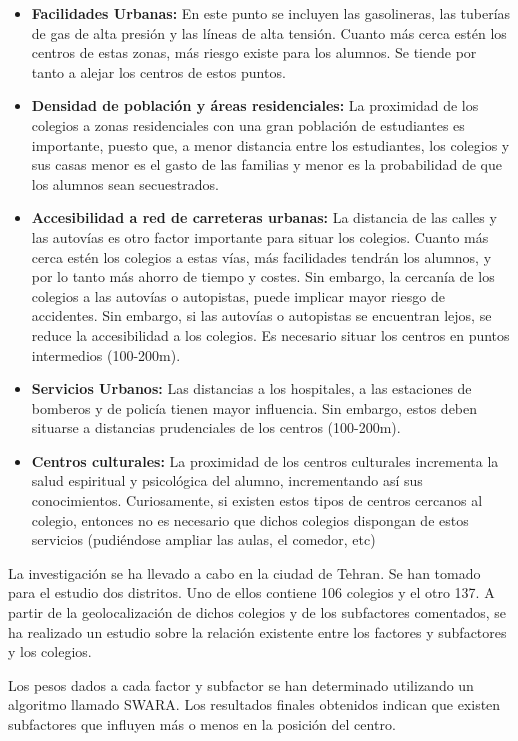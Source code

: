 \begin{itemize}
	\item \textbf{Facilidades Urbanas:} En este punto se incluyen las gasolineras, las tuberías de gas de alta presión y las líneas de alta tensión. Cuanto más cerca estén los centros de estas zonas, más riesgo existe para los alumnos. Se tiende por tanto a alejar los centros de estos puntos.
	\item \textbf{Densidad de población y áreas residenciales:} La proximidad de los colegios a zonas residenciales con una gran población de estudiantes es importante, puesto que, a menor distancia entre los estudiantes, los colegios y sus casas menor es el gasto de las familias y menor es la probabilidad de que los alumnos sean secuestrados.
	\item\textbf{ Accesibilidad a red de carreteras urbanas:} La distancia de las calles y las autovías es otro factor importante para situar los colegios. Cuanto más cerca estén los colegios a estas vías, más facilidades tendrán los alumnos, y por lo tanto más ahorro de tiempo y costes.
	Sin embargo, la cercanía de los colegios a las autovías o autopistas, puede implicar mayor riesgo de accidentes. Sin embargo, si las autovías o autopistas se encuentran lejos, se reduce la accesibilidad a los colegios. Es necesario situar los centros en puntos intermedios (100-200m).
	\item \textbf{Servicios Urbanos:} Las distancias a los hospitales, a las estaciones de bomberos y de policía tienen mayor influencia. Sin embargo, estos deben situarse a distancias prudenciales de los centros (100-200m).
	\item \textbf{Centros culturales:} La proximidad de los centros culturales incrementa la salud espiritual y psicológica del alumno, incrementando así sus conocimientos. Curiosamente, si existen estos tipos de centros cercanos al colegio, entonces no es necesario que dichos colegios dispongan de estos servicios (pudiéndose ampliar las aulas, el comedor, etc)
\end{itemize}                     

La investigación se ha llevado a cabo en la ciudad de Tehran. Se han tomado para el estudio dos distritos. Uno de ellos contiene 106 colegios y el otro 137. A partir de la geolocalización de dichos colegios y de los subfactores comentados, se ha realizado un estudio sobre la relación existente entre los factores y subfactores y los colegios.

Los pesos dados a cada factor y subfactor se han determinado utilizando un algoritmo llamado SWARA. Los resultados finales obtenidos indican que existen subfactores que influyen más o menos en la posición del centro.

